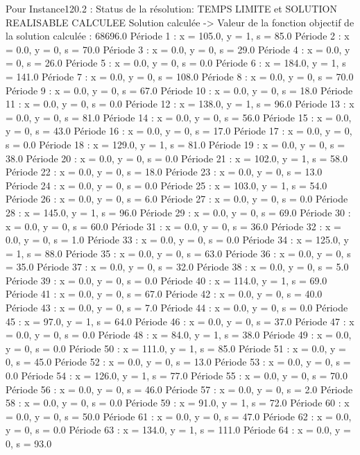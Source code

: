 Pour Instance120.2 :
Status de la résolution: TEMPS LIMITE et SOLUTION REALISABLE CALCULEE
Solution calculée
-> Valeur de la fonction objectif de la solution calculée :  68696.0
Période 1 : x = 105.0, y = 1, s = 85.0
Période 2 : x = 0.0, y = 0, s = 70.0
Période 3 : x = 0.0, y = 0, s = 29.0
Période 4 : x = 0.0, y = 0, s = 26.0
Période 5 : x = 0.0, y = 0, s = 0.0
Période 6 : x = 184.0, y = 1, s = 141.0
Période 7 : x = 0.0, y = 0, s = 108.0
Période 8 : x = 0.0, y = 0, s = 70.0
Période 9 : x = 0.0, y = 0, s = 67.0
Période 10 : x = 0.0, y = 0, s = 18.0
Période 11 : x = 0.0, y = 0, s = 0.0
Période 12 : x = 138.0, y = 1, s = 96.0
Période 13 : x = 0.0, y = 0, s = 81.0
Période 14 : x = 0.0, y = 0, s = 56.0
Période 15 : x = 0.0, y = 0, s = 43.0
Période 16 : x = 0.0, y = 0, s = 17.0
Période 17 : x = 0.0, y = 0, s = 0.0
Période 18 : x = 129.0, y = 1, s = 81.0
Période 19 : x = 0.0, y = 0, s = 38.0
Période 20 : x = 0.0, y = 0, s = 0.0
Période 21 : x = 102.0, y = 1, s = 58.0
Période 22 : x = 0.0, y = 0, s = 18.0
Période 23 : x = 0.0, y = 0, s = 13.0
Période 24 : x = 0.0, y = 0, s = 0.0
Période 25 : x = 103.0, y = 1, s = 54.0
Période 26 : x = 0.0, y = 0, s = 6.0
Période 27 : x = 0.0, y = 0, s = 0.0
Période 28 : x = 145.0, y = 1, s = 96.0
Période 29 : x = 0.0, y = 0, s = 69.0
Période 30 : x = 0.0, y = 0, s = 60.0
Période 31 : x = 0.0, y = 0, s = 36.0
Période 32 : x = 0.0, y = 0, s = 1.0
Période 33 : x = 0.0, y = 0, s = 0.0
Période 34 : x = 125.0, y = 1, s = 88.0
Période 35 : x = 0.0, y = 0, s = 63.0
Période 36 : x = 0.0, y = 0, s = 35.0
Période 37 : x = 0.0, y = 0, s = 32.0
Période 38 : x = 0.0, y = 0, s = 5.0
Période 39 : x = 0.0, y = 0, s = 0.0
Période 40 : x = 114.0, y = 1, s = 69.0
Période 41 : x = 0.0, y = 0, s = 67.0
Période 42 : x = 0.0, y = 0, s = 40.0
Période 43 : x = 0.0, y = 0, s = 7.0
Période 44 : x = 0.0, y = 0, s = 0.0
Période 45 : x = 97.0, y = 1, s = 64.0
Période 46 : x = 0.0, y = 0, s = 37.0
Période 47 : x = 0.0, y = 0, s = 0.0
Période 48 : x = 84.0, y = 1, s = 38.0
Période 49 : x = 0.0, y = 0, s = 0.0
Période 50 : x = 111.0, y = 1, s = 85.0
Période 51 : x = 0.0, y = 0, s = 45.0
Période 52 : x = 0.0, y = 0, s = 13.0
Période 53 : x = 0.0, y = 0, s = 0.0
Période 54 : x = 126.0, y = 1, s = 77.0
Période 55 : x = 0.0, y = 0, s = 70.0
Période 56 : x = 0.0, y = 0, s = 46.0
Période 57 : x = 0.0, y = 0, s = 2.0
Période 58 : x = 0.0, y = 0, s = 0.0
Période 59 : x = 91.0, y = 1, s = 72.0
Période 60 : x = 0.0, y = 0, s = 50.0
Période 61 : x = 0.0, y = 0, s = 47.0
Période 62 : x = 0.0, y = 0, s = 0.0
Période 63 : x = 134.0, y = 1, s = 111.0
Période 64 : x = 0.0, y = 0, s = 93.0
